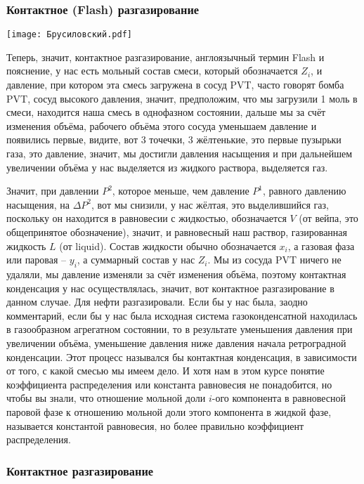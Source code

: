 \documentclass[main.tex]{subfiles}
\begin{document}
\subsubsection{Контактное (Flash) разгазирование}

\begin{center}
\texttt{[image: Брусиловский.pdf]}
\end{center}

Теперь, значит, контактное разгазирование, англоязычный термин Flash и пояснение, у нас есть мольный состав смеси, который обозначается $Z_i$, и давление, при котором эта смесь загружена в сосуд PVT, часто говорят бомба PVT, сосуд высокого давления, значит, предположим, что мы загрузили 1 моль в смеси, находится наша смесь в однофазном состоянии, дальше мы за счёт изменения объёма, рабочего объёма этого сосуда уменьшаем давление и появились первые, видите, вот 3 точечки, 3 жёлтенькие, это первые пузырьки газа, это давление, значит, мы достигли давления насыщения и при дальнейшем увеличении объёма у нас выделяется из жидкого раствора, выделяется газ.

Значит, при давлении $P^2$, которое меньше, чем давление $P^1$, равного давлению насыщения, на $\Delta P^2$, вот мы снизили, у нас жёлтая, это выделившийся газ, поскольку он находится в равновесии с жидкостью, обозначается $V$ (от вейпа, это общепринятое обозначение), значит, и равновесный наш раствор, газированная жидкость $L$ (от liquid).
Состав жидкости обычно обозначается $x_i$, а газовая фаза или паровая -- $y_i$, а суммарный состав у нас $Z_i$.
Мы из сосуда PVT ничего не удаляли, мы давление изменяли за счёт изменения объёма, поэтому контактная конденсация у нас осуществлялась, значит, вот контактное разгазирование в данном случае.
Для нефти разгазировали.
Если бы у нас была, заодно комментарий, если бы у нас была исходная система газоконденсатной находилась в газообразном агрегатном состоянии, то в результате уменьшения давления при увеличении объёма, уменьшение давления ниже давления начала ретроградной конденсации.
Этот процесс назывался бы контактная конденсация, в зависимости от того, с какой смесью мы имеем дело.
И хотя нам в этом курсе понятие коэффициента распределения или константа равновесия не понадобится, но чтобы вы знали, что отношение мольной доли $i$-ого компонента в равновесной паровой фазе к отношению мольной доли этого компонента в жидкой фазе, называется константой равновесия, но более правильно коэффициент распределения.

\subsubsection{Контактное разгазирование}
\end{document}
